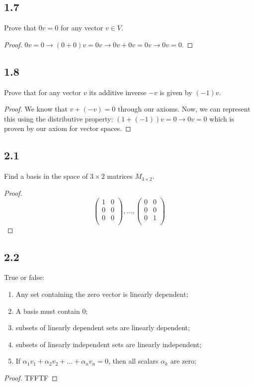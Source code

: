 \documentclass{amsart}
\begin{document}
\subsection*{1.7} Prove that $0v=0$ for any vector $v \in V$. 
\begin{proof}
    $0v = 0 \rightarrow (0 + 0)v = 0v \rightarrow 0v + 0v = 0v \rightarrow 0v = 0$.
\end{proof}
\subsection*{1.8} Prove that for any vector $v$ its additive inverse $-v$ is given by $(-1)v$. 
\begin{proof}
    We know that $v + (-v) = 0$ through our axioms. Now, we can represent this using the distributive property: $(1 + (-1))v = 0 \rightarrow 0v = 0$ which is proven by our axiom for vector spaces. 
\end{proof}
\subsection*{2.1} Find a basis in the space of $3\times 2$ matrices $M_{3\times 2}$.
\begin{proof}

\[
\begin{pmatrix}
    1 & 0 \\
    0 & 0 \\
    0 & 0 \\
\end{pmatrix}, \ldots,
\begin{pmatrix}
    0 & 0 \\
    0 & 0 \\
    0 & 1 \\
\end{pmatrix}
\]
\end{proof}
\subsection*{2.2} True or false:
\begin{enumerate}[label=\alph*)]
    \item Any set containing the zero vector is linearly dependent;
    \item A basis must contain 0;
    \item subsets of linearly dependent sets are linearly dependent;
    \item subsets of linearly independent sets are linearly independent; 
    \item If $\alpha_1v_1 + \alpha_2v_2 + \ldots + \alpha_nv_n = 0$, then all scalars $\alpha_k$ are zero;
\end{enumerate}
\begin{proof}
    TFFTF
\end{proof}
\end{document}
